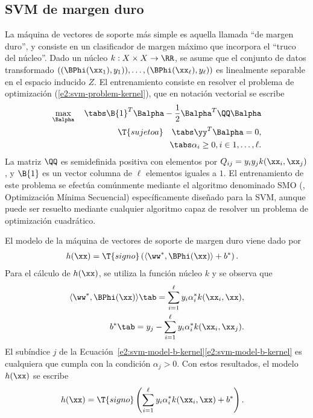 %
%
\subsection{SVM de margen duro}
%
La máquina de vectores de soporte más simple es aquella llamada ``de
margen duro'', y consiste en un clasificador de margen máximo que
incorpora el ``truco del núcleo''.
Dado un núcleo $k:X\times{}X\rightarrow\RR$,
se asume que el conjunto de datos transformado
$\left((\BPhi(\xx_1),y_1)),\ldots,(\BPhi(\xx_\ell),y_\ell)\right)$ es
linealmente separable en el espacio inducido $Z$.
El entrenamiento consiste en resolver el
problema de optimización (\ref{e2:svm-problem-kernel}), que en
notación vectorial se escribe
%
\begin{align}
  \label{e2:svm-hard-margin}
  \begin{split}
    \max_{\Balpha}\quad\tabs
      \B{1}^T\Balpha-\frac{1}{2}\Balpha^T\QQ\Balpha\\
    \T{sujeto a} \quad\tabs
      \yy^T\Balpha = 0, \\
      \tabs \alpha_i\geq 0,  i\in {1,\ldots,\ell }.
  \end{split}
\end{align}
%
La matriz $\QQ$ es semidefinida positiva con elementos por
$Q_{ij}=y_iy_jk(\xx_i,\xx_j)$, y $\B{1}$ es un vector columna de
$\ell$ elementos iguales a $1$.  El entrenamiento de este problema se
efectúa comúnmente mediante el algoritmo denominado SMO
(, Optimización Mínima
Secuencial) \cite{smo} específicamente diseñado para la SVM, aunque
puede ser resuelto mediante cualquier algoritmo capaz de resolver un
problema de optimización cuadrático.

El modelo de la máquina de vectores de soporte de margen
duro viene dado por
%
\begin{align}
  \begin{split}
    h(\xx) &= \T{signo}\left(\langle\ww^*,\BPhi(\xx)\rangle+b^*\right).
  \end{split}
\label{e2:svm-model-hard0}
\end{align}
%
Para el cálculo de $h(\xx)$, se utiliza la función núcleo $k$ y se
observa que
%
\begin{align}
  \langle\ww^*,\BPhi(\xx)\rangle \tab=
  \sum_{i=1}^\ell{}y_i\alpha^*_ik(\xx_i,\xx),\\
  b^* \tab= y_j - \sum_{i=1}^\ell{}y_i\alpha^*_ik(\xx_i,\xx_j).
  \label{e2:svm-model-b-kernel}
\end{align}
%
El subíndice $j$ de la
\iflatexml{}Ecuación~\ref{e2:svm-model-b-kernel}\else\autoref{e2:svm-model-b-kernel}\fi{}
es cualquiera que cumpla con la condición $\alpha_j>0$.  Con estos
resultados, el modelo $h(\xx)$ se escribe
%
\begin{align}
  h(\xx) &=
  \T{signo}\left(\sum_{i=1}^\ell{}y_i\alpha^*_ik(\xx_i,\xx)+b^*\right).
\label{e2:svm-model-hard}
\end{align}
%
